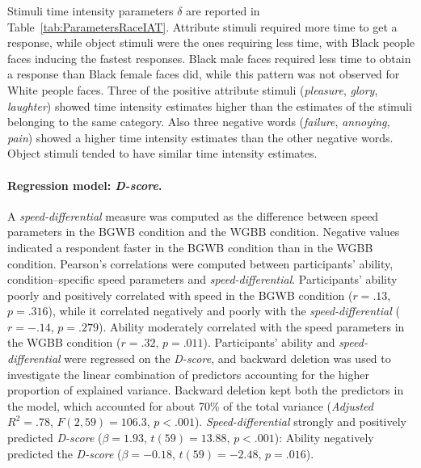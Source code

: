 \documentclass[12pt]{book}
\begin{document}

Stimuli time intensity parameters $\delta$ are reported in Table~\ref{tab:ParametersRaceIAT}. 
Attribute stimuli required more time to get a response, while object stimuli were the ones requiring less time, with Black people faces inducing the fastest responses. Black male faces required less time to obtain a response than Black female faces did, while this pattern was not observed for White people faces. Three of the positive attribute stimuli (\emph{pleasure}, \emph{glory}, \emph{laughter}) showed time intensity estimates higher than the estimates of the stimuli belonging to the same category. Also three negative words (\emph{failure}, \emph{annoying}, \emph{pain}) showed a higher time intensity estimates than the other negative words. Object stimuli tended to have similar time intensity estimates.

\paragraph{Regression model: \emph{D-score}.}
A \emph{speed-differential} measure was computed as the difference between speed parameters in the BGWB condition and the WGBB condition. Negative values indicated a respondent faster in the BGWB condition than in the WGBB condition. Pearson's correlations were computed between participants' ability, condition--specific speed parameters and \emph{speed-differential}.
Participants' ability poorly and positively correlated with speed in the BGWB condition ($r = .13$, $p = .316$), while it correlated negatively and poorly with the \emph{speed-differential} ($r = -.14$, $p = .279$). Ability moderately correlated with the speed parameters in the WGBB condition ($r = .32$, $p = .011$).
Participants' ability and \emph{speed-differential} were regressed on the \emph{D-score}, and backward deletion was used to investigate the linear combination of predictors accounting for the higher proportion of explained variance. Backward deletion kept both the predictors in the model, which accounted for about 70\% of the total variance (\emph{Adjusted} $R^2 = .78$, $F(2, 59) = 106.3$, $p < .001$). \emph{Speed-differential} strongly and positively predicted \emph{D-score} ($\beta = 1.93$, $t(59) = 13.88$, $p < .001$): Ability negatively predicted the \emph{D-score} ($\beta = -0.18$, $t(59) = -2.48$, $p = .016$).
\end{document}

